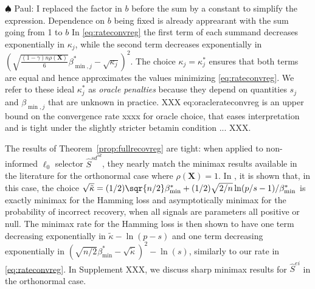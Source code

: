 \documentclass[
  12pt]{article}
\newcommand{\paul}[1]{{\small{\color{green} \sf $\spadesuit$ Paul: #1}}}
\newcommand{\bX}{\mathbf{X}}
\begin{document}
\paul{I replaced the factor in $b$ before the sum by a constant to simplify the expression. Dependence on $b$ being fixed is already apprearant with the sum going from 1 to $b$}
In \eqref{eq:rateconvreg} the first term of each summand decreases exponentially in $\kappa_j$, while the second term decreases exponentially in $(\sqrt{\frac{(1-\gamma) n\rho(\bX)}{6}}{\beta_{\min,j}^*} - \sqrt{\kappa_j})^2$. The choice $\kappa_j=\kappa^*_j$ ensures that both terms are equal and hence approximates the values minimizing \eqref{eq:rateconvreg}. We refer to these ideal $\kappa^*_j$ as {\it oracle penalties} because they depend on quantities $s_j$ and $\beta_{\min,j}$ that are unknown in practice. XXX {eq:oraclerateconvreg} is an upper bound on the convergence rate xxxx for oracle choice, that eases interpretation and is tight under the slightly stricter betamin condition ... XXX.  

The results of Theorem~\ref{prop:fullrecovreg} are tight: when applied to non-informed $\ell_0$ selector $\hat{S}^{sd}^{sd}$, they nearly match the minimax results available in the literature for the orthonormal case where $\rho(\bX)=1$. In \cite{butucea2018}, it is shown that, in this case, the choice $\sqrt{\tilde{\kappa}}=(1/2)\sqr{n/2}\beta_{\min}^*+(1/2)\sqrt{2/n}\ln(p/s-1)/\beta_{\min}^*$ is exactly minimax for the Hamming loss and asymptotically minimax for the probability of incorrect recovery, when all signals are parameters all positive or null. The minimax rate for the Hamming loss is then shown to have one term decreasing exponentially in $\tilde{\kappa}-\ln(p-s)$ and one term decreasing exponentially in $(\sqrt{n/2}\beta_{\min}^*-\sqrt{\tilde{\kappa}})^2-\ln(s)$, similarly to our rate in \eqref{eq:rateconvreg}. In Supplement XXX, we discuss sharp minimax results for $\hat S^{ei}$ in the orthonormal case. 
\end{document}
